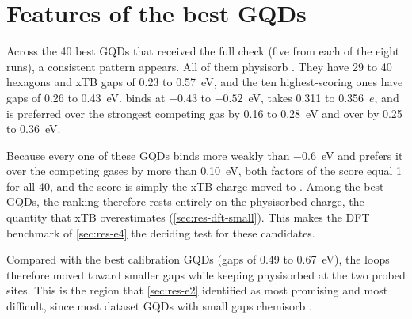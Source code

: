 \section{Features of the best GQDs}
\label{sec:res-best}

Across the 40 best GQDs that received the full check (five from each of the eight runs), a
consistent pattern appears. All of them physisorb . They have 29 to 40 hexagons and xTB
gaps of 0.23 to 0.57~eV, and the ten highest-scoring ones have gaps of 0.26 to 0.43~eV. 
binds at \(-0.43\) to \(-0.52\)~eV, takes 0.311 to 0.356~\(e\), and is preferred over the strongest
competing gas by 0.16 to 0.28~eV and over  by 0.25 to 0.36~eV.

Because every one of these GQDs binds  more weakly than \(-0.6\)~eV and prefers it over
the competing gases by more than 0.10~eV, both factors of the score equal 1 for all 40, and the
score is simply the xTB charge moved to . Among the best GQDs, the ranking therefore rests
entirely on the physisorbed charge, the quantity that xTB overestimates
(\cref{sec:res-dft-small}). This makes the DFT benchmark of \cref{sec:res-e4} the deciding test for
these candidates.

Compared with the best calibration GQDs (gaps of 0.49 to 0.67~eV), the loops therefore moved toward
smaller gaps while keeping  physisorbed at the two probed sites. This is the region that
\cref{sec:res-e2} identified as most promising and most difficult, since most dataset GQDs with
small gaps chemisorb .
